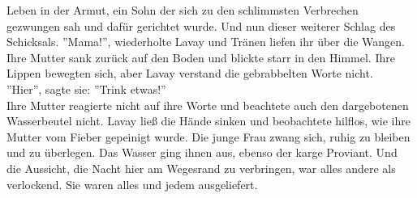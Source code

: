 Leben in der Armut, ein Sohn der sich zu den schlimmsten Verbrechen gezwungen sah und dafür 
gerichtet wurde. Und nun dieser weiterer Schlag des Schicksals. ''Mama!'', wiederholte Lavay und 
Tränen liefen ihr über die Wangen.\\
Ihre Mutter sank zurück auf den Boden und blickte starr in den Himmel. Ihre Lippen bewegten sich, 
aber Lavay verstand die gebrabbelten Worte nicht.\\
''Hier'', sagte sie: ''Trink etwas!''\\
Ihre Mutter reagierte nicht auf ihre Worte und beachtete auch den dargebotenen Wasserbeutel nicht. 
Lavay ließ die Hände sinken und beobachtete hilflos, wie ihre Mutter vom Fieber gepeinigt wurde. 
Die junge Frau zwang sich, ruhig zu bleiben und zu überlegen. Das Wasser ging ihnen aus, ebenso der 
karge Proviant. Und die Aussicht, die Nacht hier am Wegesrand zu verbringen, war alles andere als 
verlockend. Sie waren alles und jedem ausgeliefert.\\

